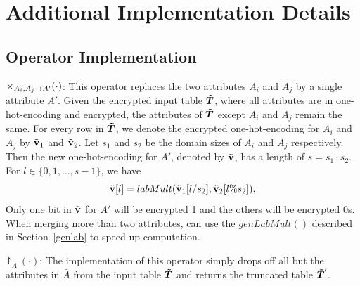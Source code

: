 \section{Additional Implementation Details}\label{app:implement}

\subsection{Operator Implementation}\label{app:implement_operators}

 $\times_{A_i,A_j\rightarrow A'}(\cdot)$: This operator replaces the two attributes $A_i$ and $A_j$ by a single attribute $A'$. Given the encrypted input table $\boldsymbol{\tilde{T}}$, where all attributes are in one-hot-encoding and encrypted, the attributes of $\boldsymbol{\tilde{T}}$ except $A_i$ and $A_j$ remain the same. For every row in $\boldsymbol{\tilde{T}}$, we denote the encrypted one-hot-encoding for $A_i$ and $A_j$ by $\tilde{\bf{v}}_1$ and $\tilde{\bf{v}}_2$.  Let $s_1$ and $s_2$ be the domain sizes of $A_i$ and $A_j$ respectively. Then the new one-hot-encoding for $A'$, denoted by $\tilde{\bf{v}}$, has a length of $s=s_1\cdot s_2$. For $l\in \{0,1,\ldots, s-1\}$, we have $$\tilde{\bf{v}}[l] = labMult(\tilde{\bf{v}}_1[l/s_2], \tilde{\bf{v}}_2[l\%s_2]).$$
Only one bit in $\tilde{\bf{v}}$ for $A'$ will be encrypted 1 and the others will be encrypted 0s. When merging more than two attributes, \system can use the $genLabMult()$ described in Section~\ref{genlab} to speed up computation.



 $\project_{\bar{A}}(\cdot)$: The implementation of this operator simply drops off all but the attributes in $\bar{A}$ from the input table $\boldsymbol{\tilde{T}}$ and returns the truncated table $\boldsymbol{\tilde{T}}'$.

